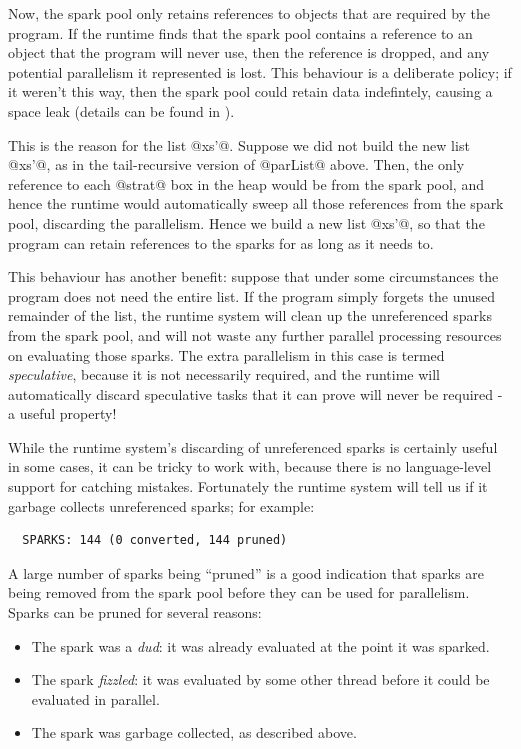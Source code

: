 Now, the spark pool only retains references to objects that are
required by the program.  If the runtime finds that the spark pool
contains a reference to an object that the program will never use,
then the reference is dropped, and any potential parallelism it
represented is lost.  This behaviour is a deliberate policy; if it
weren't this way, then the spark pool could retain data indefintely,
causing a space leak (details can be found in \citet{seq-no-more}).

This is the reason for the list @xs'@.  Suppose we did not build the
new list @xs'@, as in the tail-recursive version of @parList@ above.
Then, the only reference to each @strat@ box in the heap would be from the
spark pool, and hence the runtime would automatically sweep all those
references from the spark pool, discarding the parallelism.  Hence we
build a new list @xs'@, so that the program can retain references to
the sparks for as long as it needs to.

This behaviour has another benefit: suppose that under some
circumstances the program does not need the entire list.  If the
program simply forgets the unused remainder of the list, the runtime
system will clean up the unreferenced sparks from the spark pool, and
will not waste any further parallel processing resources on evaluating
those sparks.  The extra parallelism in this case is termed
\emph{speculative}, because it is not necessarily required, and the
runtime will automatically discard speculative tasks that it can prove
will never be required - a useful property!

While the runtime system's discarding of unreferenced sparks is
certainly useful in some cases, it can be tricky to work with, because
there is no language-level support for catching mistakes.  Fortunately
the runtime system will tell us if it garbage collects unreferenced
sparks; for example:

{\small \begin{verbatim}
  SPARKS: 144 (0 converted, 144 pruned)
\end{verbatim}}

\noindent A large number of sparks being ``pruned'' is a good
indication that sparks are being removed from the spark pool before
they can be used for parallelism.  Sparks can be pruned for several
reasons:

\begin{itemize}
\item The spark was a \emph{dud}: it was already evaluated at the
  point it was sparked.
\item The spark \emph{fizzled}: it was evaluated by some other thread
  before it could be evaluated in parallel.
\item The spark was garbage collected, as described above.
\end{itemize}

